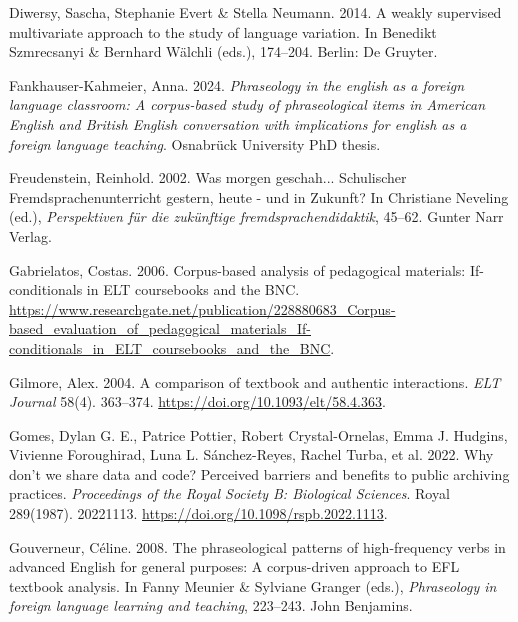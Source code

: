 \documentclass[
  letterpaper,
  DIV=11,
  numbers=noendperiod]{scrreprt}
\newlength{\cslhangindent}
\newenvironment{CSLReferences}[2] %
 {\begin{list}{}{%
  \setlength{\itemindent}{0pt}
  \setlength{\leftmargin}{0pt}
  \setlength{\parsep}{0pt}
  \ifodd #1
   \setlength{\leftmargin}{\cslhangindent}
   \setlength{\itemindent}{-1\cslhangindent}
  \fi
  \setlength{\itemsep}{#2\baselineskip}}}
 {\end{list}}
\begin{document}
\begin{CSLReferences}{1}{0}
Diwersy, Sascha, Stephanie Evert \& Stella Neumann. 2014. A weakly
supervised multivariate approach to the study of language variation. In
Benedikt Szmrecsanyi \& Bernhard Wälchli (eds.), 174--204. Berlin: De
Gruyter.

Fankhauser-Kahmeier, Anna. 2024. \emph{Phraseology in the english as a
foreign language classroom: A corpus-based study of phraseological items
in {American} {English} and {British} {English} conversation with
implications for english as a foreign language teaching}. Osnabrück
University PhD thesis.

Freudenstein, Reinhold. 2002. Was morgen geschah... {Schulischer}
{Fremdsprachenunterricht} gestern, heute - und in {Zukunft}? In
Christiane Neveling (ed.), \emph{Perspektiven für die zukünftige
fremdsprachendidaktik}, 45--62. Gunter Narr Verlag.

Gabrielatos, Costas. 2006. Corpus-based analysis of pedagogical
materials: If-conditionals in ELT coursebooks and the {BNC}.
\url{https://www.researchgate.net/publication/228880683_Corpus-based_evaluation_of_pedagogical_materials_If-conditionals_in_ELT_coursebooks_and_the_BNC}.

Gilmore, Alex. 2004. A comparison of textbook and authentic
interactions. \emph{ELT Journal} 58(4). 363--374.
\url{https://doi.org/10.1093/elt/58.4.363}.

Gomes, Dylan G. E., Patrice Pottier, Robert Crystal-Ornelas, Emma J.
Hudgins, Vivienne Foroughirad, Luna L. Sánchez-Reyes, Rachel Turba, et
al. 2022. Why don't we share data and code? Perceived barriers and
benefits to public archiving practices. \emph{Proceedings of the Royal
Society B: Biological Sciences}. Royal 289(1987). 20221113.
\url{https://doi.org/10.1098/rspb.2022.1113}.

Gouverneur, Céline. 2008. The phraseological patterns of high-frequency
verbs in advanced {English} for general purposes: A corpus-driven
approach to EFL textbook analysis. In Fanny Meunier \& Sylviane Granger
(eds.), \emph{Phraseology in foreign language learning and teaching},
223--243. John Benjamins.


\end{CSLReferences}
\end{document}
